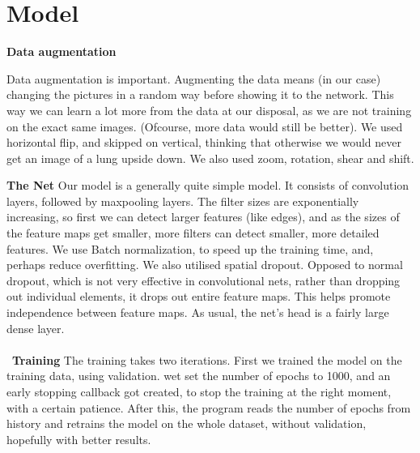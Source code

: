 \section{Model}


\textbf{Data augmentation}
\newline

Data augmentation is important. Augmenting the data means (in our case) changing the pictures in a random way before showing it to the network. This way we can learn a lot more from the data at our disposal, as we are not training on the exact same images. (Ofcourse, more data would still be better). We used horizontal flip, and skipped on vertical, thinking that otherwise we would never get an image of a lung upside down. We also used zoom, rotation, shear and shift.

\textbf{The Net}
\newline
Our model is a generally quite simple model. It consists of convolution layers, followed by maxpooling layers. The filter sizes are exponentially increasing, so first we can detect larger features (like edges), and as the sizes of the feature maps get smaller, more filters can detect smaller, more detailed features. We use Batch normalization, to speed up the training time, and, perhaps reduce overfitting. We also utilised spatial dropout. Opposed to normal dropout, which is not very effective in convolutional nets, rather than dropping out individual elements, it drops out entire feature maps. This helps promote independence between feature maps. As usual, the net’s head is a fairly large dense layer.
\\\
\\\
\textbf{Training}
\newline
The training takes two iterations. First we trained the model on the training data, using validation. wet set the number of epochs to 1000, and an early stopping callback got created, to stop the training at the right moment, with a certain patience. After this, the program reads the number of epochs from history and retrains the model on the whole dataset, without validation, hopefully with better results.